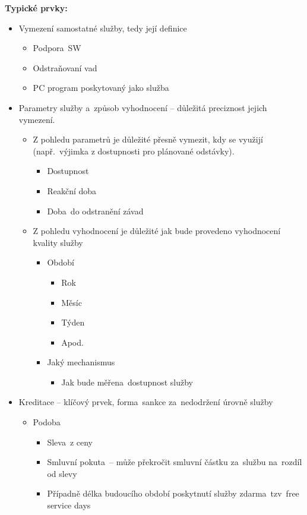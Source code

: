 \noindent\textbf{Typické prvky:}
\begin{itemize}[noitemsep]
    \item Vymezení samostatné služby, tedy její definice
    \begin{itemize}[noitemsep]
        \item Podpora~SW
        \item Odstraňovaní vad
        \item PC program poskytovaný jako služba
    \end{itemize}
    \item Parametry služby a~způsob vyhodnocení -- důležitá preciznost jejich vymezení.
    \begin{itemize}[noitemsep]
        \item Z pohledu parametrů je důležité přesně vymezit, kdy se využijí (např.\ výjimka z dostupnosti pro plánované odstávky).
        \begin{itemize}[noitemsep]
            \item Dostupnost
            \item Reakční doba
            \item Doba~do odstranění závad
        \end{itemize}
        \item  Z pohledu vyhodnocení je důležité jak bude provedeno vyhodnocení kvality služby
        \begin{itemize}[noitemsep]
            \item Období
            \begin{itemize}[noitemsep]
                \item Rok
                \item Měsíc
                \item Týden
                \item Apod.
            \end{itemize}
            \item Jaký mechanismus
            \begin{itemize}[noitemsep]
                \item Jak bude měřena~dostupnost služby
            \end{itemize}
        \end{itemize}
    \end{itemize}
    \item Kreditace -- klíčový prvek, forma~sankce za~nedodržení úrovně služby
    \begin{itemize}[noitemsep]
        \item Podoba
        \begin{itemize}[noitemsep]
            \item  Sleva~z ceny
            \item Smluvní pokuta~-- může překročit smluvní částku za~službu na~rozdíl od slevy
            \item Případně délka budoucího období poskytnutí služby zdarma~tzv~free service days
        \end{itemize}
    \end{itemize}
\end{itemize}

